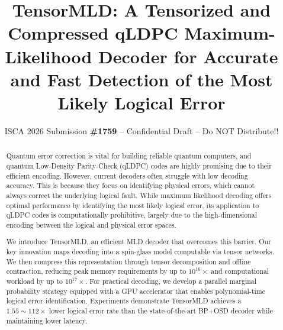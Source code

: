 \documentclass[conference]{IEEEtran}
\newcommand{\papername}{TensorMLD\xspace}
\begin{document}
\pdfpagewidth=8.5in
\pdfpageheight=11in

\newcommand{\iscasubmissionnumber}{1759}



\title{\papername: A Tensorized and Compressed qLDPC Maximum-Likelihood Decoder for Accurate and Fast Detection of the Most Likely Logical Error}
\author{\normalsize{ISCA 2026 Submission
    \textbf{\#\iscasubmissionnumber} -- Confidential Draft -- Do NOT Distribute!!}}
 

\maketitle
\thispagestyle{plain}
\pagestyle{plain}


\begin{abstract}

Quantum error correction is vital for building reliable quantum computers, and quantum Low-Density Parity-Check (qLDPC) codes are highly promising due to their efficient encoding. However, current decoders often struggle with low decoding accuracy. This is because they focus on identifying physical errors, which cannot always correct the underlying logical fault. While maximum likelihood decoding offers optimal performance by identifying the most likely logical error, its application to qLDPC codes is computationally prohibitive, largely due to the high-dimensional encoding between the logical and physical error spaces.

We introduce \papername, an efficient MLD decoder that overcomes this barrier. Our key innovation maps decoding into a spin-glass model computable via tensor networks. We then compress this representation through tensor decomposition and offline contraction, reducing peak memory requirements by up to $10^{16}\times$ and computational workload by up to $10^{17}\times$. For practical decoding, we develop a parallel marginal probability strategy equipped with a GPU accelerator that enables polynomial-time logical error identification.
Experiments demonstrate \papername achieves a $1.55 \sim 112\times$ lower logical error rate than the state-of-the-art BP+OSD decoder while maintaining lower latency.

\end{abstract}
\end{document}
